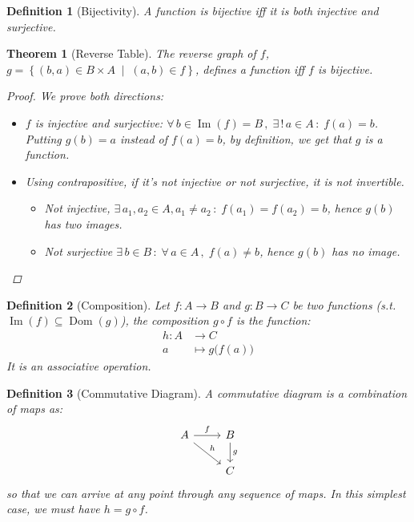 \documentclass[12pt]{article}
\let\RA\Rightarrow
\let\LA\Leftarrow
\newcommand{\set}[2]{\left\{{#1}\;\middle|\;{#2}\right\}}
\newcommand{\Forall}[1]{\forall\,{#1}\,,\;}
\newcommand{\Exist}[1]{\exists\,{#1}\,:\;}
\DeclareMathOperator{\Image}{Im}
\newtheorem{theorem}{Theorem}[subsection]
\newtheorem{definition}{Definition}[subsection]
\begin{document}
\begin{definition}[Bijectivity]
  A function is bijective iff it is both injective and surjective.
\end{definition}

\begin{theorem}[Reverse Table]
  The reverse graph of $f$, $g=\set{(b,a)\in B\times A}{(a,b)\in f}$, defines a function iff $f$ is bijective.
  \begin{proof}
    We prove both directions:
    \begin{itemize}
      \item[$(\LA)$] $f$ is injective and surjective: $\Forall{ b\in\Image(f)=B}\Exist{!\,a\in A} f(a)=b$. Putting $g(b)=a$ instead of $f(a)=b$, by definition, we get that $g$ is a function.
      \item[$(\RA)$] Using contrapositive, if it's not injective or not surjective, it is not invertible.
      \begin{itemize}
        \item Not injective, $\Exist{a_1,a_2\in A, a_1\neq a_2} f(a_1)=f(a_2)=b$, hence $g(b)$ has two images.
        \item Not surjective $\Exist{b\in B}\Forall{a\in A} f(a)\neq b$, hence $g(b)$ has no image.
      \end{itemize} 
    \end{itemize}
  \end{proof}
\end{theorem}

\begin{definition}[Composition]
  Let $f:A\to B$ and $g:B\to C$ be two functions (s.t. $\Image(f)\subseteq \operatorname{Dom}(g)$), the composition $g\circ f$ is the function:
  \begin{align*}
    h: A&\to C\\
    a&\mapsto g\big(f(a)\big)
  \end{align*}
  It is an associative operation.
\end{definition}

\begin{definition}[Commutative Diagram]
  A commutative diagram is a combination of maps as:
  $$
  \begin{tikzcd}
    A \arrow{r}{f} \arrow{dr}{h}
    & B \arrow{d}{g}\\
    & C
  \end{tikzcd}
  $$
  so that we can arrive at any point through any sequence of maps. In this simplest case, we must have $h=g\circ f$.
\end{definition}
\end{document}
